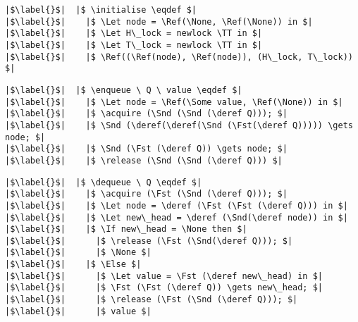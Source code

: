 \documentclass[twoside,11pt,openright]{report}
\newcommand{\acquire}{\operatorname{acquire}}
\newcommand{\release}{\operatorname{release}}
\newcommand{\initialise}{\operatorname{initialize}}
\newcommand{\enqueue}{\operatorname{enqueue}}
\newcommand{\dequeue}{\operatorname{dequeue}}
\begin{document}
\begin{verbatim}
|$\label{}$|  |$ \initialise \eqdef $|
|$\label{}$|    |$ \Let node = \Ref(\None, \Ref(\None)) in $|
|$\label{}$|    |$ \Let H\_lock = newlock \TT in $|
|$\label{}$|    |$ \Let T\_lock = newlock \TT in $|
|$\label{}$|    |$ \Ref((\Ref(node), \Ref(node)), (H\_lock, T\_lock)) $|
\end{verbatim}

\begin{verbatim}
|$\label{}$|  |$ \enqueue \ Q \ value \eqdef $|
|$\label{}$|    |$ \Let node = \Ref(\Some value, \Ref(\None)) in $|
|$\label{}$|    |$ \acquire (\Snd (\Snd (\deref Q))); $|
|$\label{}$|    |$ \Snd (\deref(\deref(\Snd (\Fst(\deref Q))))) \gets node; $|
|$\label{}$|    |$ \Snd (\Fst (\deref Q)) \gets node; $|
|$\label{}$|    |$ \release (\Snd (\Snd (\deref Q))) $|
\end{verbatim}

\begin{verbatim}
|$\label{}$|  |$ \dequeue \ Q \eqdef $|
|$\label{}$|    |$ \acquire (\Fst (\Snd (\deref Q))); $|
|$\label{}$|    |$ \Let node = \deref (\Fst (\Fst (\deref Q))) in $|
|$\label{}$|    |$ \Let new\_head = \deref (\Snd(\deref node)) in $|
|$\label{}$|    |$ \If new\_head = \None then $|
|$\label{}$|      |$ \release (\Fst (\Snd(\deref Q))); $|
|$\label{}$|      |$ \None $|
|$\label{}$|    |$ \Else $|
|$\label{}$|      |$ \Let value = \Fst (\deref new\_head) in $|
|$\label{}$|      |$ \Fst (\Fst (\deref Q)) \gets new\_head; $|
|$\label{}$|      |$ \release (\Fst (\Snd (\deref Q))); $|
|$\label{}$|      |$ value $|
\end{verbatim}


\end{document}
